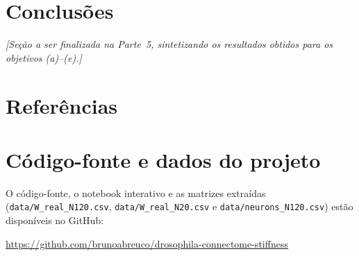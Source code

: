 \documentclass[12pt,a4paper]{article}
\begin{document}
\section{Conclusões}
\textit{[Seção a ser finalizada na Parte~5, sintetizando os resultados obtidos para os objetivos (a)--(e).]}

\section{Referências}
{\renewcommand{\section}[2]{}}

\appendix
\section{Código-fonte e dados do projeto}
\label{sec:codigo}
O código-fonte, o notebook interativo e as matrizes extraídas (\texttt{data/W\_real\_N120.csv}, \texttt{data/W\_real\_N20.csv} e \texttt{data/neurons\_N120.csv}) estão disponíveis no GitHub:

\medskip
\noindent\url{https://github.com/brunoabreuco/drosophila-connectome-stiffness}
\end{document}
